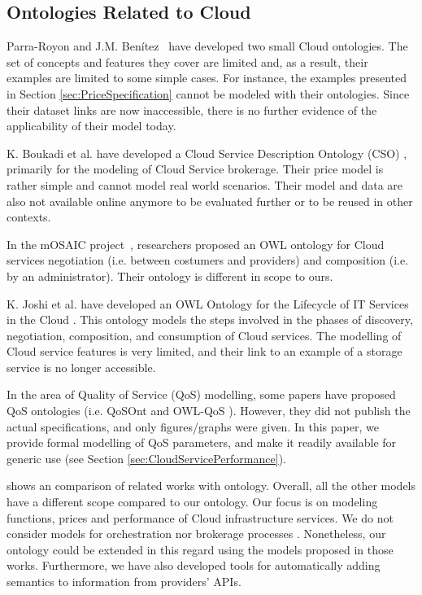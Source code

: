 \subsection{Ontologies Related to Cloud}
Parra-Royon and J.M. Ben\'{i}tez~\cite{DataMiningServicedefinitionInCloud} have developed two small Cloud ontologies. The set of concepts and features they cover are limited and, as a result, their examples are limited to some simple cases. For instance, the examples presented in Section \ref{sec:PriceSpecification}
cannot be modeled with their ontologies.
Since their dataset links are now inaccessible, there is no further evidence of the applicability of their model today.

K. Boukadi et al. have developed a Cloud Service Description Ontology (CSO) \cite{Boukadi2016CloudSD}, primarily for the modeling of Cloud Service brokerage. Their price model is rather simple and cannot model real world scenarios. Their model and data are also not available online anymore to be evaluated further or to be reused in other contexts.

In the mOSAIC project~\cite{Moscato2011AnAO}, researchers proposed an OWL ontology for Cloud services negotiation (i.e. between costumers and providers) and composition (i.e. by an administrator). Their ontology is different in scope to ours.

K. Joshi et al. have developed an OWL Ontology for the Lifecycle of IT Services in the
Cloud \cite{Joshi2014AutomatingCS}. This ontology models the steps involved in the
phases of discovery, negotiation, composition, and consumption of Cloud services.
The modelling of Cloud service features is very limited, and their link to an example of a storage service \cite{kjoshi_storage_ontology} is no longer accessible.

In the area of Quality of Service (QoS) modelling, some papers have proposed QoS ontologies (i.e. QoSOnt \cite{QoSOnt} and OWL-QoS \cite{OWL-QoS}).
However, they did not publish the actual specifications, and only figures/graphs were given.
In this paper, we provide formal modelling of QoS parameters, and make it readily available for generic use (see Section \ref{sec:CloudServicePerformance}).

 shows an comparison of related works with ontology.
Overall, all the other models have a different scope compared to our ontology. Our focus is on modeling functions, prices and performance of Cloud infrastructure services. 
We do not consider models for orchestration \cite{Moscato2011AnAO,Joshi2014AutomatingCS} nor brokerage processes \cite{Boukadi2016CloudSD}. Nonetheless, our ontology could be extended in this regard using the models proposed in those works.
Furthermore, we have also developed tools for automatically adding semantics to information from providers' APIs. 

